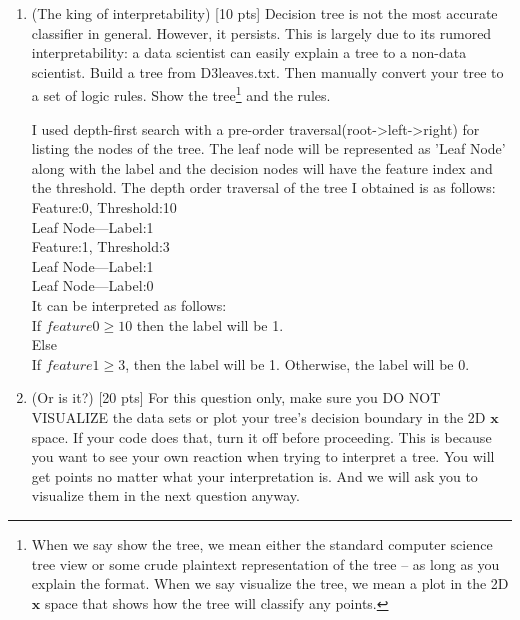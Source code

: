 \documentclass[a4paper]{article}
\theoremstyle{definition}
\def\x{\mathbf x}
\newenvironment{soln}{
    \leavevmode\color{blue}\ignorespaces
}{}
\begin{document}
\begin{enumerate}
\begin{soln}
\end{soln}
\item (The king of interpretability)  [10 pts] Decision tree is not the most accurate classifier in general.  However, it persists.  This is largely due to its rumored interpretability: a data scientist can easily explain a tree to a non-data scientist.  Build a tree from D3leaves.txt.  Then manually convert your tree to a set of logic rules.  Show the tree\footnote{When we say show the tree, we mean either the standard computer science tree view or some crude plaintext representation of the tree -- as long as you explain the format.  When we say visualize the tree, we mean a plot in the 2D $\x$ space that shows how the tree will classify any points.} and the rules. \\

\begin{soln}
    I used depth-first search with a pre-order traversal(root->left->right) for listing the nodes of the tree. The leaf node will be represented as 'Leaf Node' along with the label and the decision nodes will have the feature index and the threshold. The depth order traversal of the tree I obtained is as follows:\\
    Feature:0, Threshold:10\\
    Leaf Node---Label:1\\
    Feature:1, Threshold:3\\
    Leaf Node---Label:1\\
    Leaf Node---Label:0\\

    It can be interpreted as follows:\\
    If $feature0 \geq 10$ then the label will be 1. \\
    Else\\
    \hfill If $feature1 \geq 3$, then the label will be 1. Otherwise, the label will be 0.
\end{soln}

\item (Or is it?)  [20 pts] For this question only, make sure you DO NOT VISUALIZE the data sets or plot your tree's decision boundary in the 2D $\x$ space.  If your code does that, turn it off before proceeding.  This is because you want to see your own reaction when trying to interpret a tree.  You will get points no matter what your interpretation is.
And we will ask you to visualize them in the next question anyway.
  \begin{itemize}
  

\end{itemize}
\end{enumerate}
\end{document}
